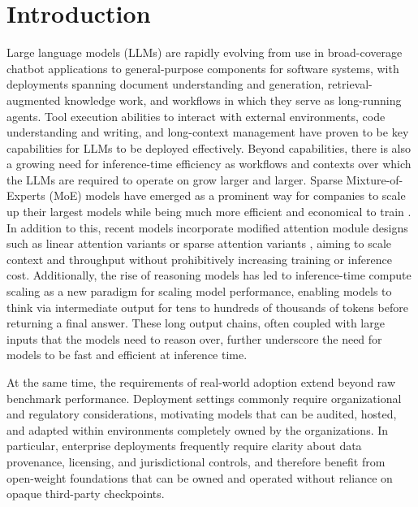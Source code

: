 \documentclass{article}
\begin{document}
\section{Introduction}
Large language models (LLMs) are rapidly evolving from use in broad-coverage chatbot applications to general-purpose components for software systems, with deployments spanning document understanding and generation, retrieval-augmented knowledge work, and workflows in which they serve as long-running agents. Tool execution abilities to interact with external environments, code understanding and writing, and long-context management have proven to be key capabilities for LLMs to be deployed effectively. Beyond capabilities, there is also a growing need for inference-time efficiency as workflows and contexts over which the LLMs are required to operate on grow larger and larger. Sparse Mixture-of-Experts (MoE) \citep{shazeer2017outrageouslylargeneuralnetworks} models have emerged as a prominent way for companies to scale up their largest models while being much more efficient and economical to train \citep{deepseekai2025deepseekv3technicalreport, 5team2025glm45agenticreasoningcoding, kimiteam2025kimik2openagentic, coreteam2026mimov2flashtechnicalreport}. In addition to this, recent models incorporate modified attention module designs such as linear attention variants \citep{kimiteam2025kimilinearexpressiveefficient, minimax2025minimax01scalingfoundationmodels, nvidia2025nemotron3nanoopen} or sparse attention variants \citep{deepseekai2025deepseekv32pushingfrontieropen, minicpmteam2025minicpm4ultraefficientllmsend, zhang2026efficientcontextscalinglongcat}, aiming to scale context and throughput without prohibitively increasing training or inference cost. Additionally, the rise of reasoning models \citep{openai2024openaio1card, Guo_2025} has led to inference-time compute scaling as a new paradigm for scaling model performance, enabling models to think via intermediate output for tens to hundreds of thousands of tokens before returning a final answer. These long output chains, often coupled with large inputs that the models need to reason over, further underscore the need for models to be fast and efficient at inference time.

At the same time, the requirements of real-world adoption extend beyond raw benchmark performance. Deployment settings commonly require organizational and regulatory considerations, motivating models that can be audited, hosted, and adapted within environments completely owned by the organizations. In particular, enterprise deployments frequently require clarity about data provenance, licensing, and jurisdictional controls, and therefore benefit from open-weight foundations that can be owned and operated without reliance on opaque third-party checkpoints.
\end{document}
